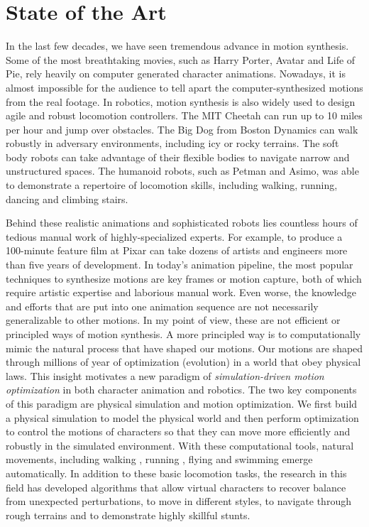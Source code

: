 \section{State of the Art}

In the last few decades, we have seen tremendous advance in motion synthesis. Some of the most breathtaking movies, such as Harry Porter, Avatar and Life of Pie, rely heavily on computer generated character animations. Nowadays, it is almost impossible for the audience to tell apart the computer-synthesized motions from the real footage. In robotics, motion synthesis is also widely used to design agile and robust locomotion controllers. The MIT Cheetah can run up to 10 miles per hour and jump over obstacles. The Big Dog from Boston Dynamics can walk robustly in adversary environments, including icy or rocky terrains. The soft body robots can take advantage of their flexible bodies to navigate narrow and unstructured spaces. The humanoid robots, such as Petman and Asimo, was able to demonstrate a repertoire of locomotion skills, including walking, running, dancing and climbing stairs.

Behind these realistic animations and sophisticated robots lies countless hours of tedious manual work of highly-specialized experts. For example, to produce a 100-minute feature film at Pixar can take dozens of artists and engineers more than five years of development. In today's animation pipeline, the most popular techniques to synthesize motions are key frames or motion capture, both of which require artistic expertise and laborious manual work. Even worse, the knowledge and efforts that are put into one animation sequence are not necessarily generalizable to other motions. In my point of view, these are not efficient or principled ways of motion synthesis. A more principled way is to computationally mimic the natural process that have shaped our motions. Our motions are shaped through millions of year of optimization (evolution) in a world that obey physical laws. This insight motivates a new paradigm of \emph{simulation-driven motion optimization} in both character animation and robotics. The two key components of this paradigm are physical simulation and motion optimization. We first build a physical simulation to model the physical world and then perform optimization to control the motions of characters so that they can move more efficiently and robustly in the simulated environment. With these computational tools, natural movements, including walking \cite{}, running \cite{}, flying \cite{} and swimming \cite{} emerge automatically. In addition to these basic locomotion tasks, the research in this field has developed algorithms that allow virtual characters to recover balance from unexpected perturbations, to move in different styles, to navigate through rough terrains and to demonstrate highly skillful stunts.

